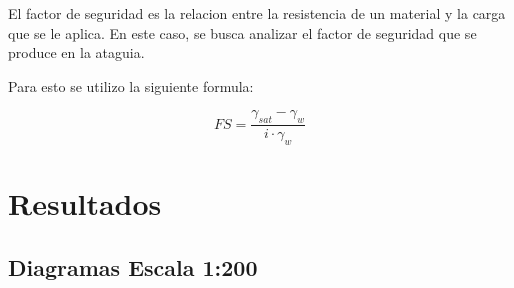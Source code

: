El factor de seguridad es la relacion entre la resistencia de un material y la carga que se le aplica. En este caso, se busca analizar el factor de seguridad que se produce en la ataguia.

Para esto se utilizo la siguiente formula:

\begin{equation}
    FS = \frac{\gamma_{sat} - \gamma_{w}}{i \cdot \gamma_{w}}
\end{equation}


\section{Resultados}

\subsection{Diagramas Escala 1:200}

